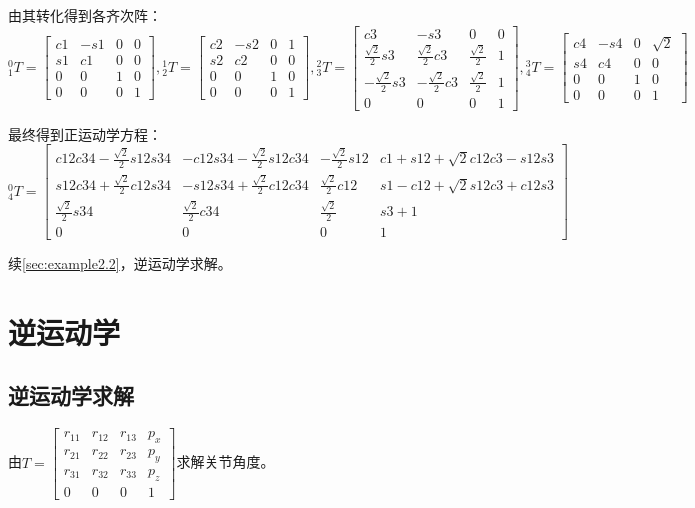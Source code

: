 \documentclass[
12pt, %
a4paper, 
oneside, %
headinclude,footinclude, %
]{scrartcl}
\begin{document}
{\footnotesize
由其转化得到各齐次阵：
$$
{}^0_1T = \begin{bmatrix} c1 & -s1 & 0 & 0 \\ s1 & c1 & 0 & 0 \\ 0 & 0 & 1 & 0 \\ 0 & 0 & 0 & 1 \end{bmatrix},
{}^1_2T = \begin{bmatrix} c2 & -s2 & 0 & 1 \\ s2 & c2 & 0 & 0 \\ 0 & 0 & 1 & 0 \\ 0 & 0 & 0 & 1 \end{bmatrix},
{}^2_3T = \begin{bmatrix} c3 & -s3 & 0 & 0 \\ \frac{\sqrt{2}}{2}s3 & \frac{\sqrt{2}}{2}c3 & \frac{\sqrt{2}}{2} & 1 \\ -\frac{\sqrt{2}}{2}s3 & -\frac{\sqrt{2}}{2}c3 & \frac{\sqrt{2}}{2} & 1 \\ 0 & 0 & 0 & 1 \end{bmatrix},
{}^3_4T = \begin{bmatrix} c4 & -s4 & 0 & \sqrt{2} \\ s4 & c4 & 0 & 0 \\ 0 & 0 & 1 & 0 \\ 0 & 0 & 0 & 1 \end{bmatrix}
$$

最终得到正运动学方程：
$$ {}^0_4T = \begin{bmatrix} c12 c34 - \frac{\sqrt{2}}{2}s12 s34 & -c12 s34 - \frac{\sqrt{2}}{2}s12 c34 & -\frac{\sqrt{2}}{2}s12 & c1 + s12 + \sqrt{2}c12 c3 - s12 s3 \\ s12 c34 + \frac{\sqrt{2}}{2}c12 s34 & -s12 s34 + \frac{\sqrt{2}}{2}c12 c34 & \frac{\sqrt{2}}{2}c12 & s1 - c12 + \sqrt{2}s12 c3 + c12 s3 \\ \frac{\sqrt{2}}{2}s34 & \frac{\sqrt{2}}{2}c34 & \frac{\sqrt{2}}{2} & s3 + 1 \\ 0 & 0 & 0 & 1 \end{bmatrix} $$

续\ref{sec:example2.2}，逆运动学求解。
}
\section{逆运动学}
\subsection[逆运动学求解]{逆运动学求解}
由$ T = \begin{bmatrix} r_{11} & r_{12} & r_{13} & p_x \\ r_{21} & r_{22} & r_{23} & p_y \\ r_{31} & r_{32} & r_{33} & p_z \\ 0 & 0 & 0 & 1 \end{bmatrix} $求解关节角度。
\end{document}
